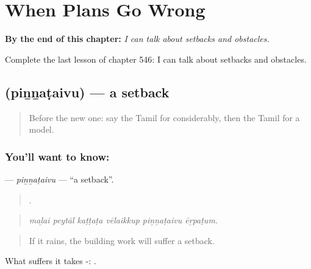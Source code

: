 
\chapter{When Plans Go Wrong}
\label{ch:ta-when-plans-go-wrong}

\begin{chapteropening}
\textbf{By the end of this chapter:} \emph{I can talk about setbacks and obstacles.}

Complete the last lesson of chapter 546: I can talk about setbacks and obstacles.
\end{chapteropening}

\section[\texorpdfstring{\ta{பின்னடைவு} (piṉṉaṭaivu)}{பின்னடைவு (piṉṉaṭaivu)}]{ (piṉṉaṭaivu) — a setback}

\label{lesson:TA-C546-pinnataivu}



\begin{quote}
Before the new one: say the Tamil for considerably, then the Tamil for a model.
\end{quote}

\subsection*{You'll want to know: }
\textbf{} — \emph{piṉṉaṭaivu} — \textquotedblleft{}a setback\textquotedblright{}.

\begin{quote}
     .
\end{quote}

\begin{quote}
\emph{maḻai peytāl kaṭṭaṭa vēlaikkup piṉṉaṭaivu ēṟpaṭum.}
\end{quote}

\begin{quote}
If it rains, the building work will suffer a setback.
\end{quote}

What suffers it takes -:  .

